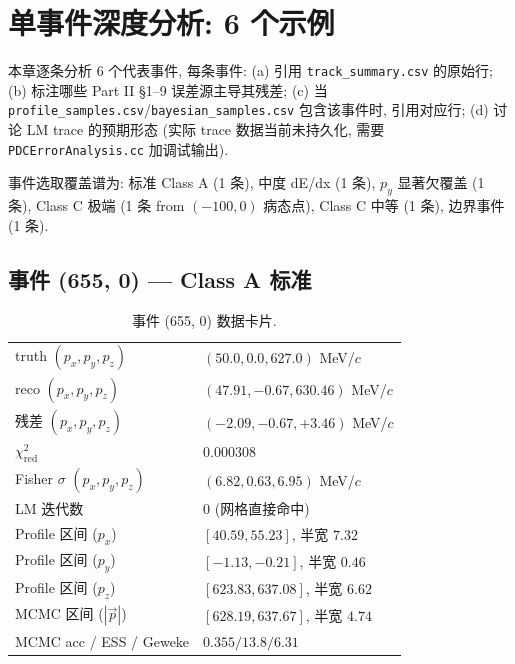 
\section{单事件深度分析: 6 个示例}
\label{sec:partIII:case_studies}

本章逐条分析 6 个代表事件, 每条事件:
(a) 引用 \texttt{track\_summary.csv} 的原始行;
(b) 标注哪些 Part II §1--9 误差源主导其残差;
(c) 当 \texttt{profile\_samples.csv}/\texttt{bayesian\_samples.csv} 包含该事件时, 引用对应行;
(d) 讨论 LM trace 的预期形态 (实际 trace 数据当前未持久化, 需要 \texttt{PDCErrorAnalysis.cc} 加调试输出).

事件选取覆盖谱为: 标准 Class A (1 条), 中度 dE/dx (1 条), $p_y$ 显著欠覆盖 (1 条), Class C 极端 (1 条 from $(-100, 0)$ 病态点), Class C 中等 (1 条), 边界事件 (1 条).

\subsection{事件 (655, 0) — Class A 标准}
\label{sec:partIII:case_studies:event_655}

\begin{table}[H]
\centering\small
\caption{事件 (655, 0) 数据卡片.}
\begin{tabular}{ll}
\toprule
truth $(p_x, p_y, p_z)$ & $(50.0, 0.0, 627.0)$ MeV/$c$ \\
reco $(p_x, p_y, p_z)$ & $(47.91, -0.67, 630.46)$ MeV/$c$ \\
残差 $(p_x, p_y, p_z)$ & $(-2.09, -0.67, +3.46)$ MeV/$c$ \\
$\chi^2_{\mathrm{red}}$ & $0.000308$ \\
Fisher $\sigma$ $(p_x, p_y, p_z)$ & $(6.82, 0.63, 6.95)$ MeV/$c$ \\
LM 迭代数 & 0 (网格直接命中) \\
Profile 区间 ($p_x$) & $[40.59, 55.23]$, 半宽 $7.32$ \\
Profile 区间 ($p_y$) & $[-1.13, -0.21]$, 半宽 $0.46$ \\
Profile 区间 ($p_z$) & $[623.83, 637.08]$, 半宽 $6.62$ \\
MCMC 区间 ($|\vec p|$) & $[628.19, 637.67]$, 半宽 $4.74$ \\
MCMC acc / ESS / Geweke & $0.355 / 13.8 / 6.31$ \\
\bottomrule
\end{tabular}
\end{table}

